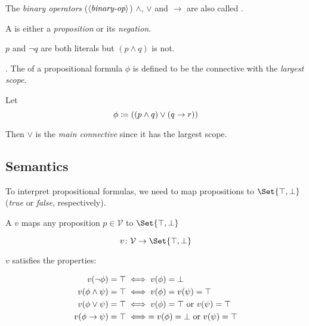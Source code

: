 The \textit{binary operators} ($\langle {\textit{binary-op}} \rangle$) $\land$, $\lor$ 
and $\to$ are also called .

\begin{definition}[Literal]
    A  is either a \textit{proposition} or 
    its \textit{negation}.
\end{definition}

\begin{example}[Literal]
    $p$ and $\neg q$ are both literals but $(p \land q)$ is not.
\end{example}

\begin{definition}.
    The  of a propositional formula $\phi$ is defined 
    to be the connective with the \textit{largest scope}.
\end{definition}

\begin{example}
    Let
    \begin{equation*}
        \phi \coloneqq ((p \land q) \lor (q \to r))
    \end{equation*}
    
    Then $\lor$ is the \textit{main connective} since it has the largest scope.
\end{example}

\subsection{Semantics}

To interpret propositional formulas, we need  to map 
propositions to $\Set{ \top, \bot }$ (\textit{true} or \textit{false}, 
respectively).

\begin{definition}[Valuation]
    A  $v$ maps any proposition $p \in \mathcal{V}$ 
    to $\Set{ \top, \bot }$
    
    \begin{equation}
        v \colon \mathcal{V} \to \Set{ \top, \bot }
    \end{equation}
    
    $v$ satisfies the properties:
    
    \begin{align}
        v(\neg \phi) = \top &\;\Longleftrightarrow\; v(\phi) = \bot \\
        v(\phi \land \psi) = \top &\;\Longleftrightarrow\; v(\phi) = v(\psi) = \top \\
        v(\phi \lor \psi) = \top 
            &\;\Longleftrightarrow\; v(\phi) = \top \text{ or } v(\psi) = \top \\
        v(\phi \to \psi) = \top 
            &\;\Longleftrightarrow\; = v(\phi) = \bot \text{ or } v(\psi) = \top
    \end{align}
\end{definition}

